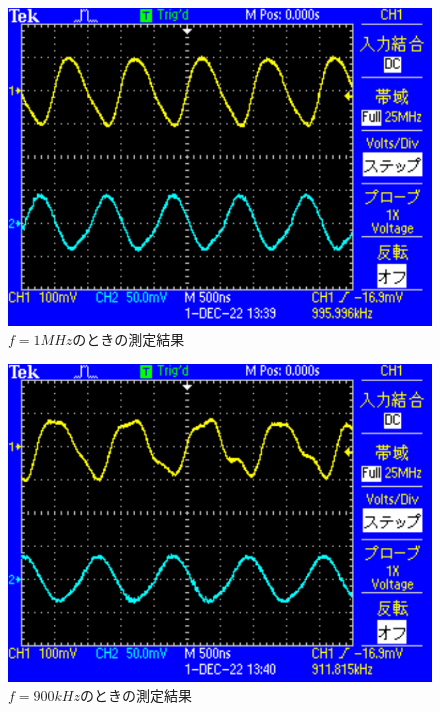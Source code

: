 \begin{figure}[H]
    \centering
    \includegraphics[scale=0.5]{TEK0001.pdf}
    \caption{$f=1\si{MHz}$のときの測定結果}
\end{figure}

\begin{figure}[H]
    \centering
    \includegraphics[scale=0.5]{TEK0002.pdf}
    \caption{$f=900\si{kHz}$のときの測定結果}
\end{figure}

